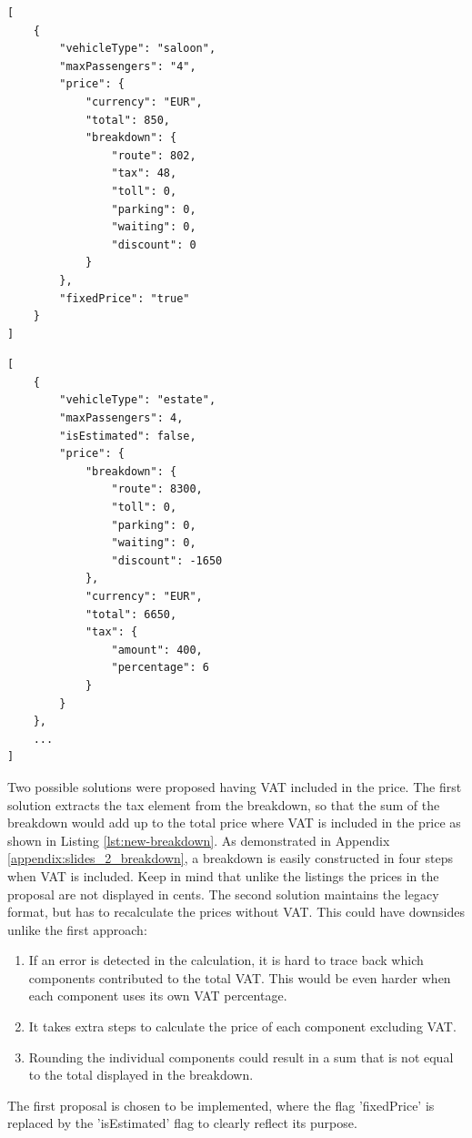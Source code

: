 \begin{lstlisting}[caption={Legacy price breakdown}, label={lst:legacy-breakdown}]
[
	{
		"vehicleType": "saloon",
		"maxPassengers": "4",
		"price": {
			"currency": "EUR",
			"total": 850,
			"breakdown": {
				"route": 802,
				"tax": 48,
				"toll": 0,
				"parking": 0,
				"waiting": 0,
				"discount": 0
			}
		},
		"fixedPrice": "true"
	}
]
\end{lstlisting}

\begin{lstlisting}[caption={Improved price breakdown}, label={lst:new-breakdown}]
[
	{
		"vehicleType": "estate",
		"maxPassengers": 4,
		"isEstimated": false,
		"price": {
			"breakdown": {
				"route": 8300,
				"toll": 0,
				"parking": 0,
				"waiting": 0,
				"discount": -1650
			},
			"currency": "EUR",
			"total": 6650,
			"tax": {
				"amount": 400,
				"percentage": 6
			}
		}
	},
	...
]
\end{lstlisting}

Two possible solutions were proposed having VAT included in the price. The first solution extracts the tax element from the breakdown, so that the sum of the breakdown would add up to the total price where VAT is included in the price as shown in Listing \ref{lst:new-breakdown}. As demonstrated in Appendix \ref{appendix:slides_2_breakdown}, a breakdown is easily constructed in four steps when VAT is included. Keep in mind that unlike the listings the prices in the proposal are not displayed in cents. The second solution maintains the legacy format, but has to recalculate the prices without VAT. This could have downsides unlike the first approach:

\begin{enumerate}
	\item If an error is detected in the calculation, it is hard to trace back which components contributed to the total VAT. This would be even harder when each component uses its own VAT percentage.
	\item It takes extra steps to calculate the price of each component excluding VAT.
	\item Rounding the individual components could result in a sum that is not equal to the total displayed in the breakdown.
\end{enumerate}

The first proposal is chosen to be implemented, where the flag 'fixedPrice' is replaced by the 'isEstimated' flag to clearly reflect its purpose.

%
